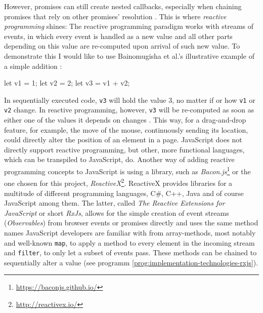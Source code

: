 However, promises can still create nested callbacks, especially when chaining promises that rely on other promises' resolution \cite{reactive-vs-promises}. This is where \emph{reactive programming} shines: The reactive programming paradigm works with streams of events, in which every event is handled as a new value and all other parts depending on this value are re-computed upon arrival of such new value. To demonstrate this I would like to use Bainomugisha et al.'s illustrative example of a simple addition \cite{reactive-programming-survey}:

\begin{JsCode}
let v1 = 1;
let v2 = 2;
let v3 = v1 + v2;
\end{JsCode}
%
In sequentially executed code, \texttt{v3} will hold the value $3$, no matter if or how \texttt{v1} or \texttt{v2} change. In reactive programming, however, \texttt{v3} will be re-computed as soon as either one of the values it depends on changes \cite{reactive-programming-survey}. This way, for a drag-and-drop feature, for example, the move of the mouse, continuously sending its location, could directly alter the position of an element in a page. JavaScript does not directly support reactive programming, but other, more functional languages, which can be transpiled to JavaScript, do. Another way of adding reactive programming concepts to JavaScript is using a library, such as \emph{Bacon.js}\footnote{\url{https://baconjs.github.io/}} or the one chosen for this project, \emph{ReactiveX}\footnote{\url{http://reactivex.io/}}. ReactiveX provides libraries for a multitude of different programming languages, C#, C++, Java and of course JavaScript among them. The latter, called \emph{The Reactive Extensions for JavaScript} or short \emph{RxJs}, allows for the simple creation of event streams (\emph{Observables}) from browser events or promises directly and uses the same method names JavaScript developers are familiar with from array-methods, most notably and well-known \texttt{map}, to apply a method to every element in the incoming stream and \texttt{filter}, to only let a subset of events pass. These methods can be chained to sequentially alter a value (see programm \ref{prog:implementation-technologies-rxjs}).

